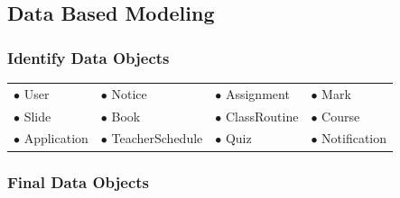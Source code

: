 \documentclass[12pt,a4paper]{article}
\begin{document}
\subsection{Data Based Modeling}

\subsubsection{Identify Data Objects}

\begin{center}
\begin{tabular}{llll}
$\bullet$ User & $\bullet$ Notice & $\bullet$ Assignment & $\bullet$ Mark \\
$\bullet$ Slide & $\bullet$ Book & $\bullet$ ClassRoutine & $\bullet$ Course \\
$\bullet$ Application & $\bullet$ TeacherSchedule & $\bullet$ Quiz & $\bullet$ Notification \\
\end{tabular}
\end{center}

\subsubsection{Final Data Objects}
\end{document}
